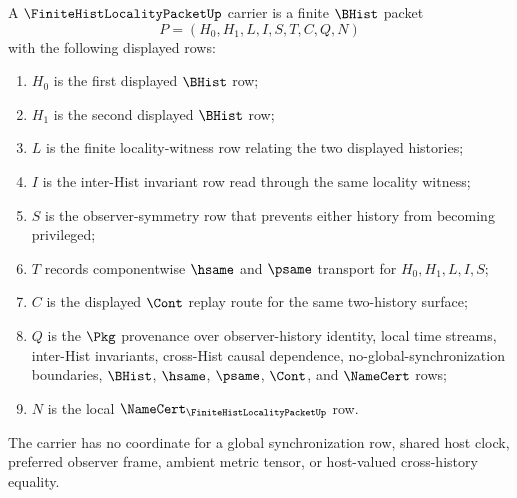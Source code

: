 \begin{definition}
\label{def:finite-hist-locality-packet-carrier}
A $\FiniteHistLocalityPacketUp$ carrier is a finite $\BHist$ packet
$$
P=(H_0,H_1,L,I,S,T,C,Q,N)
$$
with the following displayed rows:
\begin{enumerate}
\item $H_0$ is the first displayed $\BHist$ row;
\item $H_1$ is the second displayed $\BHist$ row;
\item $L$ is the finite locality-witness row relating the two displayed histories;
\item $I$ is the inter-Hist invariant row read through the same locality witness;
\item $S$ is the observer-symmetry row that prevents either history from becoming privileged;
\item $T$ records componentwise $\hsame$ and $\psame$ transport for $H_0,H_1,L,I,S$;
\item $C$ is the displayed $\Cont$ replay route for the same two-history surface;
\item $Q$ is the $\Pkg$ provenance over observer-history identity, local time streams, inter-Hist invariants, cross-Hist causal dependence, no-global-synchronization boundaries, $\BHist$, $\hsame$, $\psame$, $\Cont$, and $\NameCert$ rows;
\item $N$ is the local $\NameCert_{\FiniteHistLocalityPacketUp}$ row.
\end{enumerate}
The carrier has no coordinate for a global synchronization row, shared host clock, preferred observer frame, ambient metric tensor, or host-valued cross-history equality.
\end{definition}

